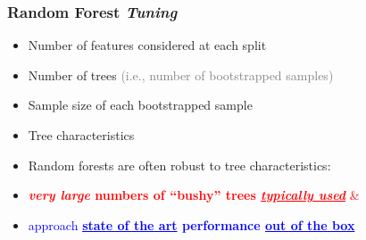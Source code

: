 \documentclass[xcolor={dvipsnames}]{beamer}
\begin{document}
\frame
{
\frametitle{Random Forest \emph{Tuning}}

\begin{itemize}
\item<1->[$g(p)$:] Number of features considered at each split
\item<2->[$m$:] Number of trees \textcolor{gray}{(i.e., number of bootstrapped samples)}
\item<3->[$n_b$:] Sample size of each bootstrapped sample 
\item<4->[$\chi$:] Tree characteristics 
\end{itemize}
\vspace{-.5em}
\vspace{-.5em}
\begin{itemize}
\item<6-> Random forests are often robust to tree characteristics:
\item<7->[] \textcolor{red}{\textbf{\emph{very large} numbers of ``bushy'' trees \underline{\emph{typically used}}} \&}  
\item<8->[] \textcolor{blue}{approach \textbf{\underline{state of the art} performance \underline{out of the box}}}

\end{itemize}
}
\end{document}
